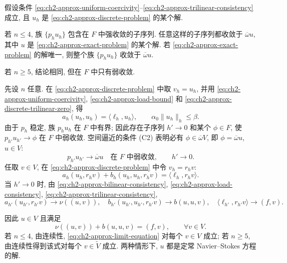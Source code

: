 \begin{Theorem}
\label{thm:ch2-approx-general-convergence}
假设条件 \eqref{eq:ch2-approx-uniform-coercivity}--\eqref{eq:ch2-approx-trilinear-consistency} 成立, 且 $u_h$ 是 \eqref{eq:ch2-approx-discrete-problem} 的某个解.

若 $n\leq4$, 族 $\{p_hu_h\}$ 包含在 $F$ 中强收敛的子序列. 任意这样的子序列都收敛于 $\overline\omega u$, 其中 $u$ 是 \eqref{eq:ch2-approx-exact-problem} 的某个解. 若 \eqref{eq:ch2-approx-exact-problem} 的解唯一, 则整个族 $\{p_hu_h\}$ 收敛于 $\overline\omega u$.

若 $n\geq5$, 结论相同, 但在 $F$ 中只有弱收敛.
\end{Theorem}

\begin{Proof}
先设 $n$ 任意. 在 \eqref{eq:ch2-approx-discrete-problem} 中取 $v_h=u_h$, 并用 \eqref{eq:ch2-approx-uniform-coercivity}, \eqref{eq:ch2-approx-load-bound} 和 \eqref{eq:ch2-approx-discrete-trilinear-zero}, 得
\begin{equation}
a_h(u_h,u_h)=\langle\ell_h,u_h\rangle,
\qquad
\alpha_0\lVert u_h\rVert_h\leq\beta.
\label{eq:ch2-approx-uniform-solution-bound}
\end{equation}
由于 $p_h$ 稳定, 族 $p_hu_h$ 在 $F$ 中有界; 因此存在子序列 $h'\to0$ 和某个 $\phi\in F$, 使 $p_{h'}u_{h'}\to\phi$ 在 $F$ 中弱收敛. 空间逼近的条件 (C2) 表明必有 $\phi\in\overline\omega V$, 即 $\phi=\overline\omega u$, $u\in V$:
\begin{equation}
p_{h'}u_{h'}\longrightarrow\overline\omega u
\quad\text{在 }F\text{ 中弱收敛},\qquad h'\to0.
\label{eq:ch2-approx-weak-subsequence}
\end{equation}
任取 $v\in V$, 在 \eqref{eq:ch2-approx-discrete-problem} 中令 $v_h=r_hv$:
\begin{equation}
a_h(u_h,r_hv)+b_h(u_h,u_h,r_hv)=\langle\ell_h,r_hv\rangle.
\label{eq:ch2-approx-test-lifted}
\end{equation}
当 $h'\to0$ 时, 由 \eqref{eq:ch2-approx-bilinear-consistency}, \eqref{eq:ch2-approx-load-consistency}, \eqref{eq:ch2-approx-trilinear-consistency},
\[
a_{h'}(u_{h'},r_{h'}v)\to\nu((u,v)),\quad
b_{h'}(u_{h'},u_{h'},r_{h'}v)\to b(u,u,v),\quad
\langle\ell_{h'},r_{h'}v\rangle\to(f,v).
\]

\hypertarget{chapter-02-page-152}{}
因此 $u\in V$ 且满足
\begin{equation}
\nu((u,v))+b(u,u,v)=(f,v),
\qquad\forall v\in V.
\label{eq:ch2-approx-limit-equation}
\end{equation}
若 $n\leq4$, 由连续性, \eqref{eq:ch2-approx-limit-equation} 对每个 $v\in V$ 成立; 若 $n\geq5$, 由连续性得到该式对每个 $v\in\widetilde V$ 成立. 两种情形下, $u$ 都是定常 Navier--Stokes 方程的解.


\end{Proof}

